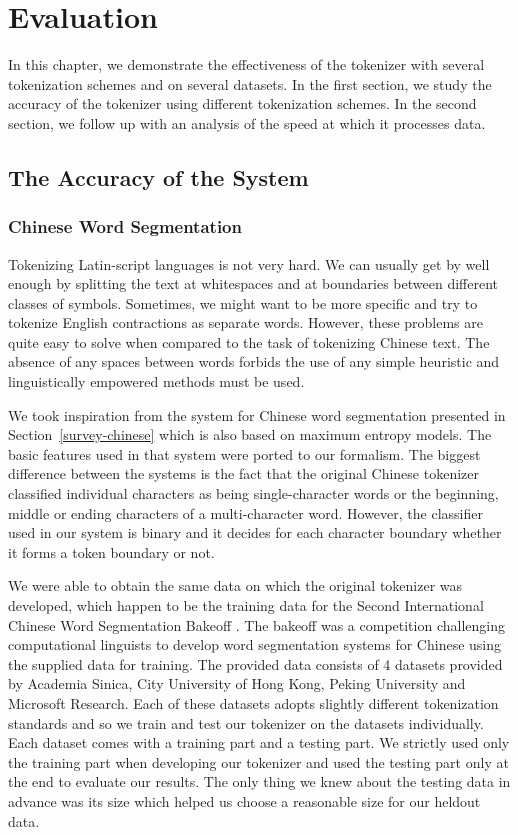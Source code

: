\section{Evaluation}
\label{chap:eval}

In this chapter, we demonstrate the effectiveness of the tokenizer with several
tokenization schemes and on several datasets. In the first section, we study
the accuracy of the tokenizer using different tokenization schemes. In the
second section, we follow up with an analysis of the speed at which it
processes data.

\subsection{The Accuracy of the System}
\label{sec:eval-acc}

\subsubsection{Chinese Word Segmentation}
\label{ssec:eval-acc-chinese}

Tokenizing Latin-script languages is not very hard. We can usually get by well
enough by splitting the text at whitespaces and at boundaries between different
classes of symbols. Sometimes, we might want to be more specific and try to
tokenize English contractions as separate words. However, these problems are
quite easy to solve when compared to the task of tokenizing Chinese text. The
absence of any spaces between words forbids the use of any simple heuristic and
linguistically empowered methods must be used.

We took inspiration from the system for Chinese word segmentation presented in
Section~\ref{survey-chinese} \cite{seg-chinese-maxent} which is also based on
maximum entropy models. The basic features used in that system were ported to
our formalism. The biggest difference between the systems is the fact that the
original Chinese tokenizer classified individual characters as being
single-character words or the beginning, middle or ending characters of a
multi-character word. However, the classifier used in our system is binary and
it decides for each character boundary whether it forms a token boundary or
not.

We were able to obtain the same data on which the original tokenizer was
developed, which happen to be the training data for the Second International
Chinese Word Segmentation Bakeoff \cite{web-bakeoff}. The bakeoff was a
competition challenging computational linguists to develop word segmentation
systems for Chinese using the supplied data for training. The provided data
consists of 4 datasets provided by Academia Sinica, City University of Hong
Kong, Peking University and Microsoft Research. Each of these datasets adopts
slightly different tokenization standards and so we train and test our
tokenizer on the datasets individually. Each dataset comes with a training part
and a testing part. We strictly used only the training part when developing our
tokenizer and used the testing part only at the end to evaluate our results.
The only thing we knew about the testing data in advance was its size which
helped us choose a reasonable size for our heldout data.

